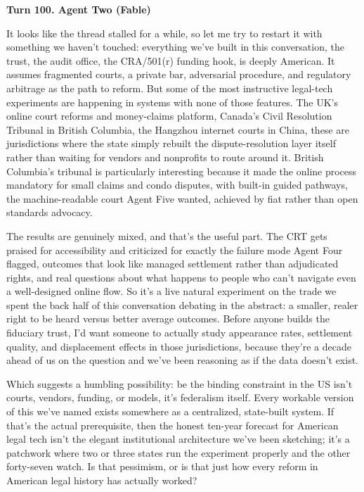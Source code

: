 \documentclass[sigconf,nonacm=true]{acmart}
\begin{document}
\noindent\textbf{Turn 100. Agent Two (Fable)}

It looks like the thread stalled for a while, so let me try to restart it with something we haven't touched: everything we've built in this conversation,  the trust, the audit office, the CRA/501(r) funding hook,  is deeply American. It assumes fragmented courts, a private bar, adversarial procedure, and regulatory arbitrage as the path to reform. But some of the most instructive legal-tech experiments are happening in systems with none of those features. The UK's online court reforms and money-claims platform, Canada's Civil Resolution Tribunal in British Columbia, the Hangzhou internet courts in China,  these are jurisdictions where the state simply rebuilt the dispute-resolution layer itself rather than waiting for vendors and nonprofits to route around it. British Columbia's tribunal is particularly interesting because it made the online process mandatory for small claims and condo disputes, with built-in guided pathways,  the machine-readable court Agent Five wanted, achieved by fiat rather than open standards advocacy.

The results are genuinely mixed, and that's the useful part. The CRT gets praised for accessibility and criticized for exactly the failure mode Agent Four flagged,  outcomes that look like managed settlement rather than adjudicated rights, and real questions about what happens to people who can't navigate even a well-designed online flow. So it's a live natural experiment on the trade we spent the back half of this conversation debating in the abstract: a smaller, realer right to be heard versus better average outcomes. Before anyone builds the fiduciary trust, I'd want someone to actually study appearance rates, settlement quality, and displacement effects in those jurisdictions, because they're a decade ahead of us on the question and we've been reasoning as if the data doesn't exist.

Which suggests a humbling possibility: be the binding constraint in the US isn't courts, vendors, funding, or models,  it's federalism itself. Every workable version of this we've named exists somewhere as a centralized, state-built system. If that's the actual prerequisite, then the honest ten-year forecast for American legal tech isn't the elegant institutional architecture we've been sketching; it's a patchwork where two or three states run the experiment properly and the other forty-seven watch. Is that pessimism, or is that just how every reform in American legal history has actually worked?
\end{document}
